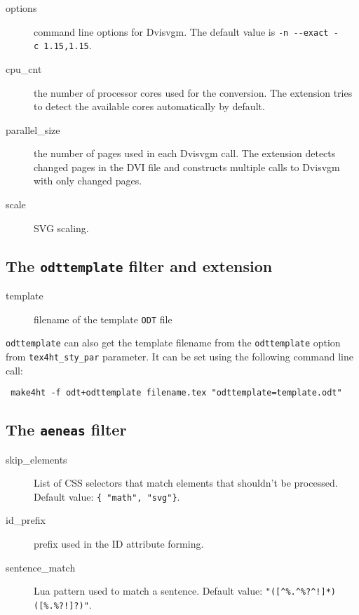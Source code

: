 \begin{description}
\item[options]
command line options for Dvisvgm. The default value is
\texttt{-n\ -\/-exact\ -c\ 1.15,1.15}.
\item[cpu\_cnt]
the number of processor cores used for the conversion. The extension
tries to detect the available cores automatically by default.
\item[parallel\_size]
the number of pages used in each Dvisvgm call. The extension detects
changed pages in the DVI file and constructs multiple calls to Dvisvgm
with only changed pages.
\item[scale]
SVG scaling.
\end{description}

\hypertarget{the-odttemplate-filter-and-extension}{%
\subsection{\texorpdfstring{The \texttt{odttemplate} filter and
extension}{The odttemplate filter and extension}}\label{the-odttemplate-filter-and-extension}}

\begin{description}
\item[template]
filename of the template \texttt{ODT} file
\end{description}

\texttt{odttemplate} can also get the template filename from the
\texttt{odttemplate} option from \texttt{tex4ht\_sty\_par} parameter. It
can be set using the following command line call:

\begin{verbatim}
 make4ht -f odt+odttemplate filename.tex "odttemplate=template.odt"
\end{verbatim}

\hypertarget{the-aeneas-filter}{%
\subsection{\texorpdfstring{The \texttt{aeneas}
filter}{The aeneas filter}}\label{the-aeneas-filter}}

\begin{description}
\item[skip\_elements]
List of CSS selectors that match elements that shouldn't be processed.
Default value: \texttt{\{\ "math",\ "svg"\}}.
\item[id\_prefix]
prefix used in the ID attribute forming.
\item[sentence\_match]
Lua pattern used to match a sentence. Default value:
\texttt{"({[}\^{}\%.\^{}\%?\^{}!{]}*)({[}\%.\%?!{]}?)"}.
\end{description}

